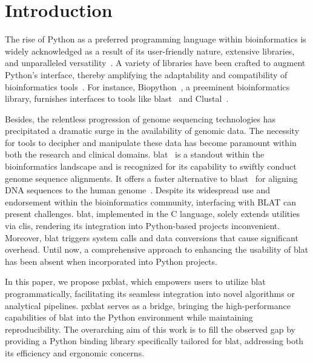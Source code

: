 \section*{Introduction}\label{sec:introduction}

The rise of Python as a preferred programming language within bioinformatics is widely acknowledged as a result of its user-friendly nature, extensive libraries, and unparalleled versatility~\citep{perkel2015programming}.
A variety of libraries have been crafted to augment Python's interface, thereby amplifying the adaptability and compatibility of bioinformatics tools~\citep{putri2022analysing, cock2009biopython}.
For instance, Biopython~\citep{cock2009biopython}, a preeminent bioinformatics library, furnishes interfaces to tools like \gls{blast}~\citep{altschul1990basic} and Clustal~\citep{higgins1988clustal}.

Besides, the relentless progression of genome sequencing technologies has precipitated a dramatic surge in the availability of genomic data.
The necessity for tools to decipher and manipulate these data has become paramount within both the research and clinical domains.
\gls{blat}~\citep{kent2002blat} is a standout within the bioinformatics landscape and is recognized for its capability to swiftly conduct genome sequence alignments.
It offers a faster alternative to \gls{blast}~\citep{altschul1990basic} for aligning DNA sequences to the human genome~\citep{kent2002blat}.
Despite its widespread use and endorsement within the bioinformatics community, interfacing with BLAT can present challenges.
\gls{blat}, implemented in the C language, solely extends utilities via \glspl{cli}, rendering its integration into Python-based projects inconvenient.
Moreover, \gls{blat} triggers system calls and data conversions that cause significant overhead.
Until now, a comprehensive approach to enhancing the usability of \gls{blat} has been absent when incorporated into Python projects.

In this paper, we propose \gls{pxblat}, which empowers users to utilize \gls{blat} programmatically, facilitating its seamless integration into novel algorithms or analytical pipelines.
\gls{pxblat} serves as a bridge, bringing the high-performance capabilities of \gls{blat} into the Python environment while maintaining reproducibility.
The overarching aim of this work is to fill the observed gap by providing a Python binding library specifically tailored for \gls{blat}, addressing both its efficiency and ergonomic concerns.

